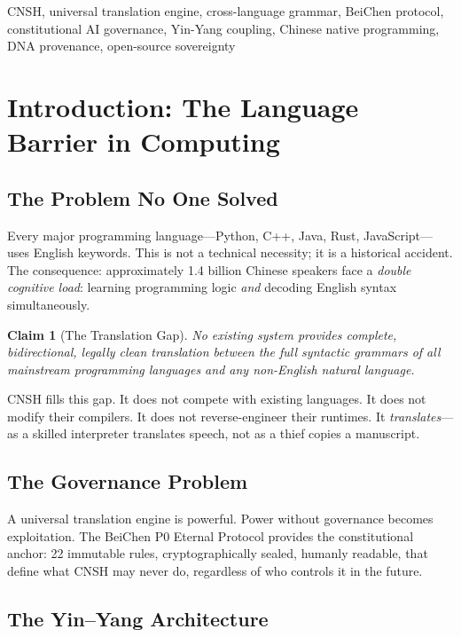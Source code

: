 \documentclass[conference]{IEEEtran}
\newtheorem{claim}{Claim}
\begin{document}
\begin{IEEEkeywords}
CNSH, universal translation engine, cross-language grammar,
BeiChen protocol, constitutional AI governance, Yin-Yang coupling,
Chinese native programming, DNA provenance, open-source sovereignty
\end{IEEEkeywords}

\section{Introduction: The Language Barrier in Computing}

\subsection{The Problem No One Solved}

Every major programming language---Python, C++, Java, Rust,
JavaScript---uses English keywords.
This is not a technical necessity; it is a historical accident.
The consequence: approximately 1.4 billion Chinese speakers
face a \emph{double cognitive load}: learning programming logic
\emph{and} decoding English syntax simultaneously.

\begin{claim}[The Translation Gap]
No existing system provides complete, bidirectional, legally clean
translation between the full syntactic grammars of all mainstream
programming languages and any non-English natural language.
\end{claim}

CNSH fills this gap.
It does not compete with existing languages.
It does not modify their compilers.
It does not reverse-engineer their runtimes.
It \emph{translates}---as a skilled interpreter translates speech,
not as a thief copies a manuscript.

\subsection{The Governance Problem}

A universal translation engine is powerful.
Power without governance becomes exploitation.
The BeiChen P0 Eternal Protocol provides the constitutional
anchor: 22 immutable rules, cryptographically sealed,
humanly readable, that define what CNSH may never do,
regardless of who controls it in the future.

\subsection{The Yin--Yang Architecture}
\end{document}
